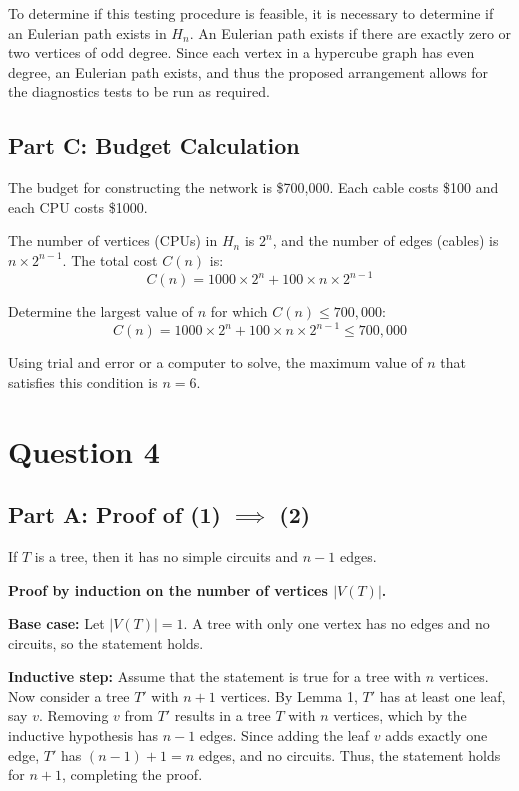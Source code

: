 \documentclass{article}
\begin{document}
	To determine if this testing procedure is feasible, it is necessary to determine if an Eulerian path exists in $ H_n $. An Eulerian path exists if there are exactly zero or two vertices of odd degree. Since each vertex in a hypercube graph has even degree, an Eulerian path exists, and thus the proposed arrangement allows for the diagnostics tests to be run as required.
	
	\subsection*{Part C: Budget Calculation}
	The budget for constructing the network is \$700,000. Each cable costs \$100 and each CPU costs \$1000.
	
	The number of vertices (CPUs) in $ H_n $ is $ 2^n $, and the number of edges (cables) is $ n \times 2^{n-1} $. The total cost $ C(n) $ is:
	\[C(n) = 1000 \times 2^n + 100 \times n \times 2^{n-1}\]
	
	Determine the largest value of $ n $ for which $ C(n) \leq 700,000 $:
	\[C(n) = 1000 \times 2^n + 100 \times n \times 2^{n-1} \leq 700,000\]
	
	Using trial and error or a computer to solve, the maximum value of $ n $ that satisfies this condition is $ n = 6 $.
	
	\section*{Question 4}
	
	\subsection*{Part A: Proof of (1) $\implies$ (2)}
	If $ T $ is a tree, then it has no simple circuits and $ n - 1 $ edges.
	
	\textbf{Proof by induction on the number of vertices $|V(T)|$.}
	
	\textbf{Base case:} Let $|V(T)| = 1$. A tree with only one vertex has no edges and no circuits, so the statement holds.
	
	\textbf{Inductive step:} Assume that the statement is true for a tree with $ n $ vertices. Now consider a tree $ T' $ with $ n + 1 $ vertices. By Lemma 1, $ T' $ has at least one leaf, say $ v $. Removing $ v $ from $ T' $ results in a tree $ T $ with $ n $ vertices, which by the inductive hypothesis has $ n - 1 $ edges. Since adding the leaf $ v $ adds exactly one edge, $ T' $ has $ (n - 1) + 1 = n $ edges, and no circuits. Thus, the statement holds for $ n + 1 $, completing the proof.
	
\end{document}
